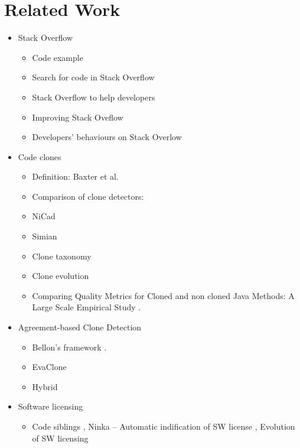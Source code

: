 \documentclass{sig-alternate-05-2015}
\begin{document}
\section{Related Work}
\begin{itemize}
	\item Stack Overflow
	\begin{itemize}
		\item Code example \cite{Nasehi2012}
		\item Search for code in Stack Overflow \cite{Diamantopoulos2015,Keivanloo2014,Park2014, Stolee2014}
		\item Stack Overflow to help developers \cite{Ponzanelli2013, Ponzanelli2014}
		\item Improving Stack Oveflow \cite{Diamantopoulos2015, Wang2014, Bosu2013}
		\item Developers' behaviours on Stack Overlow \cite{Wang2013_StackOverflow, Movshovitz-Attias2013}
	\end{itemize}
	\item Code clones 
		\begin{itemize}
			\item Definition: Baxter et al. \cite{Baxter1998}
			\item Comparison of clone detectors: \cite{Roy2008, Ragkhitwetsagul2016,Svajlenko2014}
			\item NiCad \cite{Roy2008,Cordy}
			\item Simian \cite{simian}
			\item Clone taxonomy \cite{Kapser2003}
			\item Clone evolution \cite{Pate2013,Mondal2011}
			\item Comparing Quality Metrics for Cloned and non cloned Java Methods: A Large Scale Empirical Study \cite{Saini2016}.
		\end{itemize}
	\item Agreement-based Clone Detection
	\begin{itemize}
		\item Bellon's framework \cite{Bellon2007}.
		\item EvaClone \cite{Wang2013}
		\item Hybrid \cite{Funaro2010}
	\end{itemize}
	\item Software licensing
	\begin{itemize}
		\item Code siblings \cite{German2009}, Ninka -- Automatic indification of SW license \cite{German2010}, Evolution of SW licensing \cite{DiPenta2010}
	\end{itemize}

\end{itemize}
\end{document}

